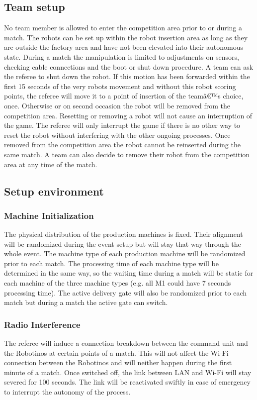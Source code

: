 \documentclass[12pt,twoside]{article}
\begin{document}
\subsection{Team setup}
\label{sec:team-setup}
No team member is allowed to enter the competition area prior to or
during a match. The robots can be set up within the robot insertion
area as long as they are outside the factory area and have not been
elevated into their autonomous state. During a match the manipulation
is limited to adjustments on sensors, checking cable connections and
the boot or shut down procedure. A team can ask the referee to shut
down the robot. If this motion has been forwarded within the first 15
seconds of the very robots movement and without this robot scoring
points, the referee will move it to a point of insertion of the teamâ€™s
choice, once. Otherwise or on second occasion the robot will be
removed from the competition area. Resetting or removing a robot will
not cause an interruption of the game. The referee will only interrupt
the game if there is no other way to reset the robot without
interfering with the other ongoing processes. Once removed from the
competition area the robot cannot be reinserted during the same match.
A team can also decide to remove their robot from the competition area
at any time of the match.

\subsection{Setup environment}
\subsubsection{Machine Initialization}

The physical distribution of the production machines is fixed. Their
alignment will be randomized during the event setup but will stay that
way through the whole event. The machine type of each production
machine will be randomized prior to each match. The processing time of
each machine type will be determined in the same way, so the waiting
time during a match will be static for each machine of the three
machine types (e.g. all M1 could have 7 seconds processing time). The
active delivery gate will also be randomized prior to each match but
during a match the active gate can switch.


\subsubsection{Radio Interference}
\label{sec:radio-interference}
The referee will induce a connection breakdown between the command
unit and the Robotinos at certain points of a match. This will not
affect the Wi-Fi connection between the Robotinos and will neither
happen during the first minute of a match. Once switched off, the link
between LAN and Wi-Fi will stay severed for 100 seconds. The link will
be reactivated swiftly in case of emergency to interrupt the autonomy
of the process.
\end{document}
